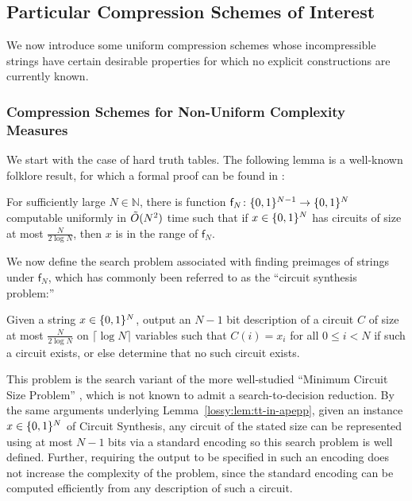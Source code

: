 \subsection{Particular Compression Schemes of Interest}\label{lossy:subsec:particular-pairs}
We now introduce some uniform compression schemes whose incompressible strings have certain desirable properties for which no explicit constructions are currently known.
\subsubsection{Compression Schemes for Non-Uniform Complexity Measures}\label{lossy:subsubsec:tt-gens}
We start with the case of hard truth tables. The following lemma is a well-known folklore result, for which a formal proof can be found in \cite{Korten}:
\begin{lemma}\label{lossy:lem:tt-in-apepp}
For sufficiently large $N \in \mathbb{N}$, there is function $\mathsf{f}_N\colon \B^{N-1} \rightarrow \B^{N}$ computable uniformly in $\Tilde{O}(N^2)$ time such that if $x \in \B^N$ has circuits of size at most $\frac{N}{2 \log N}$, then $x$ is in the range of $\mathsf{f}_N$.
\end{lemma}

We now define the search problem associated with finding preimages of strings under $\mathsf{f}_N$, which has commonly been referred to as the ``circuit synthesis problem:''
\begin{definition}
Given a string $x \in \B^N$, output an $N-1$ bit description of a circuit $C$ of size at most $\frac{N}{2\log N}$ on $\lceil \log N \rceil$ variables such that  $C(i) = x_i$ for all $0 \leq i < N$ if such a circuit exists, or else determine that no such circuit exists. 
\end{definition}
This problem is the search variant of the more well-studied ``Minimum Circuit Size Problem'' \cite{circuit-minimization}, which is not known to admit a search-to-decision reduction. By the same arguments underlying Lemma~\ref{lossy:lem:tt-in-apepp}, given an instance $x \in \B^N$ of {\sc Circuit Synthesis}, any circuit of the stated size can be represented using at most $N-1$ bits via a standard encoding so this search problem is well defined. Further, requiring the output to be specified in such an encoding does not increase the complexity of the problem, since the standard encoding can be computed efficiently from any description of such a circuit. 

